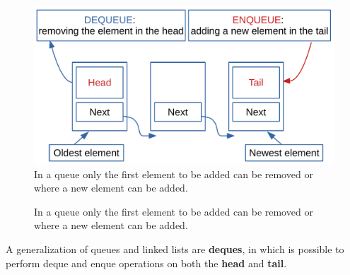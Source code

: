 \begin{figure}[H]
	\begin{center}
		\includegraphics[scale=.6]{chapters/datastructures/images/queue_1.pdf}
		\caption[Allowed operations on queue elements.]{In a queue only the first element to be added can be removed or where a new element can be added.}
		\label{queue_1}
	\end{center}
\end{figure}

\begin{figure}[H]
\centering
{}
\caption[Allowed operations on queue elements.]{In a queue only the first element to be added can be removed or where a new element can be added.}
\label{queue_1}
\end{figure}

A generalization of queues and linked lists are \textbf{deques}, in which is possible to perform deque and enque operations on both the \textbf{head} and \textbf{tail}.

